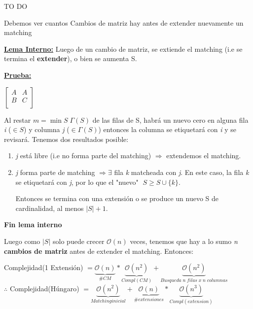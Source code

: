 \documentclass[12pt,a4paper]{report}
\begin{document}
\begin{enumerate}
				TO DO
				
				Debemos ver cuantos Cambios de matriz hay antes de extender nuevamente un matching
				
				\underline{\textbf{Lema Interno:}} Luego de un cambio de matriz, se extiende el matching (i.e se termina el \textbf{extender}), o bien se aumenta S.
				
				\underline{\textbf{Prueba:}} 
				
				\begin{center}
				$
				\begin{bmatrix}
				A & A \\
				B  & C \\
				\end{bmatrix}					
				$
				\end{center}				
				
				Al restar $\textit{m} = \min S \; \Gamma(S)$ de las filas de S, habrá un nuevo cero en alguna fila \textit{i} ($\in S$) y columna \textit{j} ($\in \Gamma(S)$) entonces la columna se etiquetará con \textit{i} y se revisará.
				Tenemos dos resultados posible:
				\begin{enumerate}
					\item \textit{j} está libre (i.e no forma parte del matching) $\Rightarrow$ extendemos el matching.
					\item \textit{j} forma parte de matching $\Rightarrow \exists$ fila \textit{k} matcheada con \textit{j}. En este caso, la fila \textit{k} se etiquetará con \textit{j}, por lo que el "nuevo" $\; S \geq S \cup \{\textit{k}\}$.
					
					\vspace{5mm}
					Entonces se termina con una extensión o se produce un nuevo S de cardinalidad, al menos $\lvert S \rvert + 1$.
				\end{enumerate}
				
				\textbf{Fin lema interno}
				
				Luego como $\lvert S \rvert$ solo puede crecer $\mathcal{O}(n)$ veces, tenemos que hay a lo sumo \textit{n} \textbf{cambios de matriz} antes de extender el matching. Entonces:
				
							\begin{center}
								Complejidad(1 Extensión) $= \underbrace{\mathcal{O}(n)}_{\# CM} * \underbrace{\mathcal{O}(n^{2})}_{Compl(CM)} + \underbrace{\mathcal{O}(n^{2})}_{Busqueda \; \textit{n} \; filas \; x \; \textit{n} \; columnas }$ \\
								\vspace{5mm}
								$\therefore$ Complejidad(Húngaro) $= \underbrace{\mathcal{O}(n^{2})}_{Matching inicial} + \underbrace{\mathcal{O}(n)}_{\#extensiones} * \underbrace{\mathcal{O}(n^{3})}_{Compl(extension)}$
							\end{center}				
			\end{enumerate}
	
\end{document}
